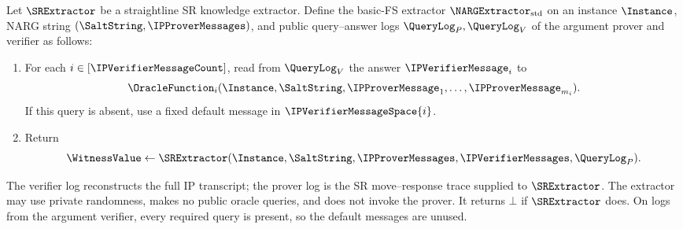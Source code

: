 \begin{definition}
\label{def:basic_fs_straightline_extractor}
Let \(\SRExtractor\) be a straightline SR knowledge extractor. Define the basic-FS extractor \(\NARGExtractor_{\mathrm{std}}\) on an instance \(\Instance\), NARG string \((\SaltString,\IPProverMessages)\), and public query--answer logs \(\QueryLog_P,\QueryLog_V\) of the argument prover and verifier as follows:
\begin{enumerate}
\item For each \(i\in[\IPVerifierMessageCount]\), read from \(\QueryLog_V\) the answer \(\IPVerifierMessage_i\) to
\begin{equation*}
  \OracleFunction_i(\Instance,\SaltString,
    \IPProverMessage_1,\ldots,\IPProverMessage_{m_i}).
\end{equation*}
If this query is absent, use a fixed default message in \(\IPVerifierMessageSpace{i}\).
\item Return
\begin{equation*}
  \WitnessValue\leftarrow\SRExtractor
    (\Instance,\SaltString,\IPProverMessages,\IPVerifierMessages,\QueryLog_P).
\end{equation*}
\end{enumerate}
The verifier log reconstructs the full IP transcript; the prover log is the SR move--response trace supplied to \(\SRExtractor\). The extractor may use private randomness, makes no public oracle queries, and does not invoke the prover. It returns \(\bot\) if \(\SRExtractor\) does. On logs from the argument verifier, every required query is present, so the default messages are unused.
\leanok
\end{definition}

